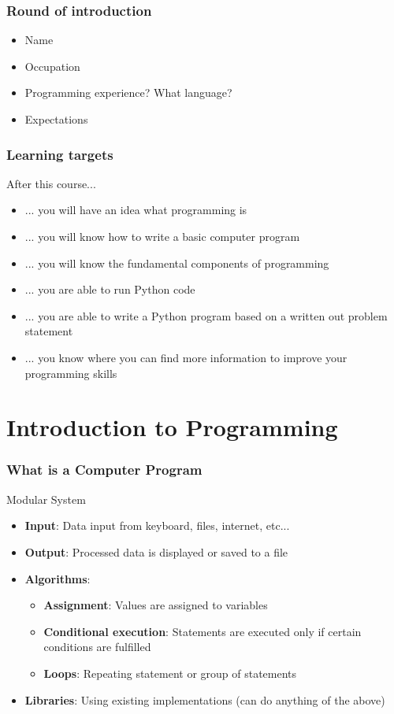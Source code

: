 \documentclass[10pt, a4paper]{beamer} %
\begin{document}
\begin{frame}[c]\frametitle{Round of introduction}
    \begin{itemize}
        \item Name
        \item Occupation
        \item Programming experience? What language?
        \item Expectations
    \end{itemize}
\end{frame}

\begin{frame}[c]\frametitle{Learning targets}
    
After this course...
\begin{itemize}
    \item ... you will have an idea what programming is
    \item ... you will know how to write a basic computer program
    \item ... you will know the fundamental components of programming
    \item ... you are able to run Python code
    \item ... you are able to write a Python program based on a written out
    problem statement
    \item ... you know where you can find more information to improve your
    programming skills
\end{itemize}
\end{frame}


\section{Introduction to Programming} %
\label{sec:introduction_to_programming}

\begin{frame}[c]\frametitle{What is a Computer Program}
\begin{block}{Modular System}
    \begin{itemize}
        \item \textbf{Input}: Data input from keyboard, files, internet, etc...
        \item \textbf{Output}: Processed data is displayed or saved to a file
        \item \textbf{Algorithms}:
        \begin{itemize}
            \item \textbf{Assignment}: Values are assigned to variables
            \item \textbf{Conditional execution}: Statements are executed only if certain
            conditions are fulfilled
            \item \textbf{Loops}: Repeating statement or group of statements
        \end{itemize}
        
        \item \textbf{Libraries}: Using existing implementations (can do anything of the above)
    \end{itemize}

\end{block}     
\end{frame}
\end{document}
